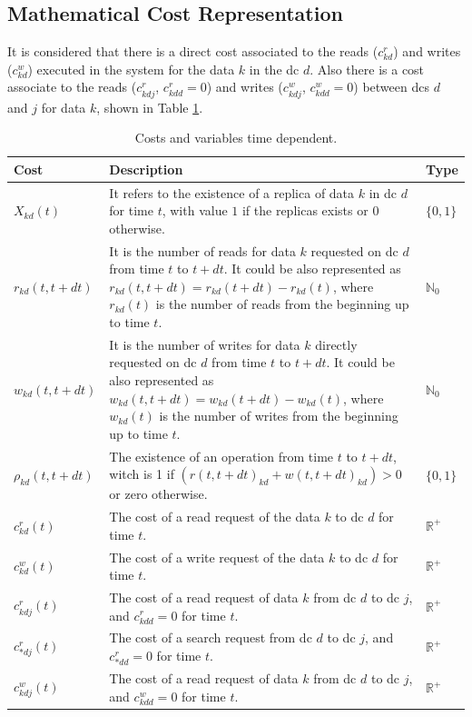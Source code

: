 \documentclass[english]{article}
\begin{document}
\subsection{Mathematical Cost Representation} \label{sec:math_cost_representation}
It is considered that there is a direct cost associated to the reads ($c^{r}_{kd}$) and writes ($c^{w}_{kd}$) executed in the system for the data $k$ in the \gls{dc} $d$. Also there is a cost associate to the reads ($c^{r}_{kdj}$, $c^{r}_{kdd} = 0$) and writes ($c^{w}_{kdj}$, $c^{w}_{kdd} = 0$) between \glspl{dc} $d$ and $j$ for data $k$, shown in Table \ref{tb:costs}.
\begin{table}[ht!]
	\begin{center}
		\begin{tabular}{|l|p{8cm}|l|}
			\hline
			Cost                         & Description & Type \\
			\hline
			\hline
			$X_{kd}(t)$            & It refers to the existence of a replica of data $k$ in \gls{dc} $d$ for time $t$, with value $1$ if the replicas exists or $0$ otherwise. & $\{0, 1\}$\\
			\hline
			$r_{kd}(t, t+dt)$       & It is the number of reads for data $k$ requested on \gls{dc} $d$ from time $t$ to $t+dt$. It could be also represented as $r_{kd}(t, t+dt) = r_{kd}(t+dt) - r_{kd}(t)$, where $r_{kd}(t)$ is the number of reads from the beginning up to time $t$. & $\mathbb{N}_{0}$ \\
			\hline
			$w_{kd}(t, t+dt)$      & It is the number of writes for data $k$ directly requested on \gls{dc} $d$ from time $t$ to $t+dt$. It could be also represented as $w_{kd}(t, t+dt) = w_{kd}(t+dt) - w_{kd}(t)$, where $w_{kd}(t)$ is the number of writes from the beginning up to time $t$. & $\mathbb{N}_{0}$ \\
			\hline
			$\rho_{kd}(t, t+dt) $ & The existence of an operation from time $t$ to $t+dt$, witch is 1 if $(r(t, t+dt)_{kd} + w(t, t+dt)_{kd}) > 0$ or zero otherwise. & $\{0, 1\}$ \\
			\hline
			$c^{r}_{kd}(t)$           & The cost of a read request of the data $k$ to \gls{dc} $d$ for time $t$. & $\mathbb{R}^{+}$ \\
			\hline
			$c^{w}_{kd}(t)$          & The cost of a write request of the data $k$ to \gls{dc} $d$ for time $t$. & $\mathbb{R}^{+}$ \\
			\hline
			$c^{r}_{kdj}(t)$           & The cost of a read request of data $k$ from \gls{dc} $d$ to \gls{dc} $j$, and $c^{r}_{kdd} = 0$ for time $t$. & $\mathbb{R}^{+}$ \\
			\hline
			$c^{r}_{*dj}(t)$           & The cost of a search request from \gls{dc} $d$ to \gls{dc} $j$, and $c^{r}_{*dd} = 0$ for time $t$. & $\mathbb{R}^{+}$ \\
			\hline
			$c^{w}_{kdj}(t)$         & The cost of a read request of data $k$ from \gls{dc} $d$ to \gls{dc} $j$, and $c^{w}_{kdd} = 0$ for time $t$. & $\mathbb{R}^{+}$ \\
			\hline
		\end{tabular}
	\end{center}

	\caption{Costs and variables time dependent.}
	\label{tb:costs}
\end{table}
\end{document}
